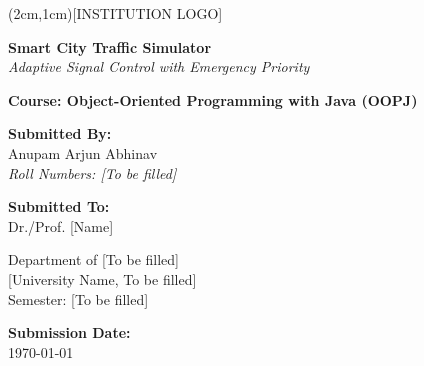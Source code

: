 \documentclass[12pt,a4paper]{article}
\begin{document}
\begin{titlepage}
    \centering
    \vspace*{0.5cm}

    \framebox(2cm,1cm){[INSTITUTION LOGO]}
    \vspace{1cm}

    {\Huge \textbf{Smart City Traffic Simulator}} \\
    \vspace{0.3cm}
    {\large \textit{Adaptive Signal Control with Emergency Priority}} \\
    \vspace{1.3cm}

    {\Large \textbf{Course: Object-Oriented Programming with Java (OOPJ)}} \\
    \vspace{1.2cm}

    \textbf{Submitted By:} \\
    \vspace{0.4cm}
    {\large Anupam  \quad Arjun  \quad Abhinav} \\
    \vspace{0.2cm}
    \textit{Roll Numbers: [To be filled]} \\

    \vspace{1.5cm}

    \textbf{Submitted To:} \\
    {\large Dr./Prof. [Name]} \\

    \vspace{1.5cm}

    Department of [To be filled] \\
    \vspace{0.2cm}
    [University Name, To be filled] \\
    \vspace{0.2cm}
    Semester: [To be filled] \\

    \vfill

    \textbf{Submission Date:} \\
    {\large \today}

\end{titlepage}

\newpage

\tableofcontents
\newpage
\end{document}
